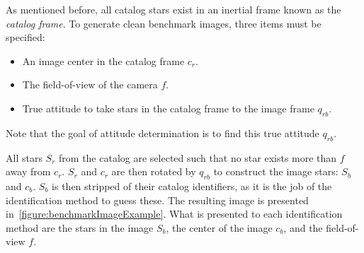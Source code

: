 As mentioned before, all catalog stars exist in an inertial frame known as the \textit{catalog frame}.
To generate clean benchmark images, three items must be specified:
\begin{itemize}
    \item An image center in the catalog frame $c_r$.
    \item The field-of-view of the camera $f$.
    \item True attitude to take stars in the catalog frame to the image frame $q_{rb}$.
\end{itemize}

Note that the goal of attitude determination is to find this true attitude $q_{rb}$.

\begin{figure}
\end{figure}

All stars $S_r$ from the catalog are selected such that no star exists more than $f$ away from $c_r$.
$S_r$ and $c_r$ are then rotated by $q_{rb}$ to construct the image stars: $S_b$ and $c_b$.
$S_b$ is then stripped of their catalog identifiers, as it is the job of the identification method to guess these.
The resulting image is presented in~\autoref{figure:benchmarkImageExample}.
What is presented to each identification method are the stars in the image $S_b$, the center of the image $c_b$, and
the field-of-view $f$.

